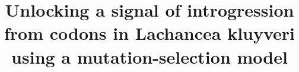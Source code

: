 \documentclass[doublespacing,linenumbers]{bmcart-modified}
\begin{document}
  
\begin{frontmatter}

\begin{fmbox}
  
\title{Unlocking a signal of introgression from codons in Lachancea kluyveri using a mutation-selection model}

\author[
   addressref={aff1, aff2, aff3},                   %
   corref={aff3},                       %
   email={cedric.landerer@gmail.com}   %
]{ }
\author[
   addressref={aff1,aff2},
   email={bomeara@utk.edu}
]{ }
\author[
   addressref={aff2,aff4},
   email={russell.zaretzki@gmail.com}
]{ }
\author[
   addressref={aff1,aff2},
   email={mikeg@utk.edu}
]{ }



\end{fmbox}
\end{frontmatter}
\end{document}

